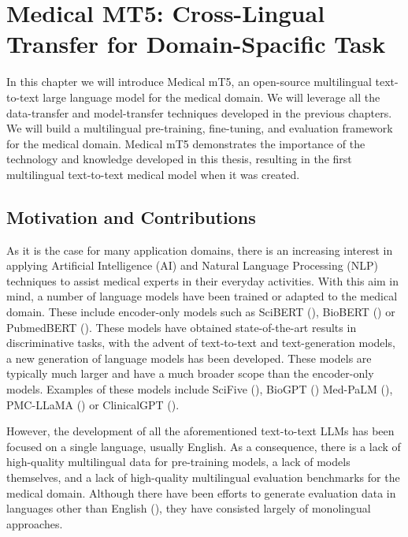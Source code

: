 \chapter[Medical MT5: Cross-Lingual Transfer for Domain-Spacific Task]{Medical MT5: Cross-Lingual Transfer for Domain-Spacific Task}
\label{ch:medicalmt5}

In this chapter we will introduce Medical mT5, an open-source multilingual text-to-text large language model for the medical domain. We will leverage all the data-transfer and model-transfer techniques developed in the previous chapters. We will build a multilingual pre-training, fine-tuning, and evaluation framework for the medical domain. Medical mT5 demonstrates the importance of the technology and knowledge developed in this thesis, resulting in the first multilingual text-to-text medical model when it was created.

\section{Motivation and Contributions}


As it is the case for many application domains, there is an increasing interest in applying Artificial Intelligence (AI) and Natural Language Processing (NLP) techniques to assist medical experts in their everyday activities. With this aim in mind, a number of language models have been trained or adapted to the medical domain. These include encoder-only models such as  SciBERT (\cite{beltagy2019scibert}), BioBERT (\cite{DBLP:journals/bioinformatics/LeeYKKKSK20}) or PubmedBERT (\cite{DBLP:journals/health/GuTCLULNGP22}). These models have obtained state-of-the-art results in discriminative tasks, with the advent of text-to-text and text-generation models, a new generation of language models has been developed. These models are typically much larger and have a much broader scope than the encoder-only models. Examples of these models include SciFive (\cite{DBLP:journals/corr/abs-2106-03598}), BioGPT (\cite{10.1093/bib/bbac409})
Med-PaLM (\cite{singhal-palm}), PMC-LLaMA (\cite{wu2023pmcllama}) or ClinicalGPT (\cite{Wang2023ClinicalGPTLL}).

However, the development of all the aforementioned text-to-text LLMs has been focused on a single language, usually English. As a consequence, there is a lack of high-quality multilingual data for pre-training models, a lack of models themselves, and a lack of high-quality multilingual evaluation benchmarks for the medical domain. Although there have been efforts to generate evaluation data in languages other than English (\cite{Wang2023ClinicalGPTLL,carrino-etal-2022-pretrained}), they have consisted largely of monolingual approaches.

